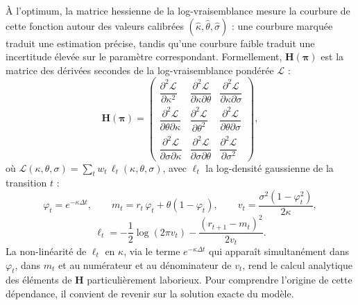 À l'optimum, la matrice hessienne de la log-vraisemblance mesure la courbure de cette fonction autour des valeurs calibrées $(\hat{\kappa}, \hat{\theta}, \hat{\sigma})$ : une courbure marquée traduit une estimation précise, tandis qu'une courbure faible traduit une incertitude élevée sur le paramètre correspondant. Formellement, $\mathbf{H}(\boldsymbol{\pi})$ est la matrice des dérivées secondes de la log-vraisemblance pondérée $\mathcal{L}$ :
\[
    \mathbf{H}(\boldsymbol{\pi}) = \begin{pmatrix}
        \dfrac{\partial^2 \mathcal{L}}{\partial \kappa^2} & \dfrac{\partial^2 \mathcal{L}}{\partial \kappa \partial \theta} & \dfrac{\partial^2 \mathcal{L}}{\partial \kappa \partial \sigma} \\[10pt]
        \dfrac{\partial^2 \mathcal{L}}{\partial \theta \partial \kappa} & \dfrac{\partial^2 \mathcal{L}}{\partial \theta^2} & \dfrac{\partial^2 \mathcal{L}}{\partial \theta \partial \sigma} \\[10pt]
        \dfrac{\partial^2 \mathcal{L}}{\partial \sigma \partial \kappa} & \dfrac{\partial^2 \mathcal{L}}{\partial \sigma \partial \theta} & \dfrac{\partial^2 \mathcal{L}}{\partial \sigma^2}
    \end{pmatrix},
\]
où $\mathcal{L}(\kappa, \theta, \sigma) = \sum_t w_t\,\ell_t(\kappa, \theta, \sigma)$, avec $\ell_t$ la log-densité gaussienne de la transition $t$ :
\[
    \varphi_t = e^{-\kappa\Delta t}, \qquad m_t = r_t\,\varphi_t + \theta(1-\varphi_t), \qquad v_t = \frac{\sigma^2(1-\varphi_t^2)}{2\kappa},
\]
\[
    \ell_t = -\frac{1}{2}\log(2\pi v_t) - \frac{(r_{t+1} - m_t)^2}{2v_t}.
\]
La non-linéarité de $\ell_t$ en $\kappa$, via le terme $e^{-\kappa\Delta t}$ qui apparaît simultanément dans $\varphi_t$, dans $m_t$ et au numérateur et au dénominateur de $v_t$, rend le calcul analytique des éléments de $\mathbf{H}$ particulièrement laborieux. Pour comprendre l'origine de cette dépendance, il convient de revenir sur la solution exacte du modèle.

